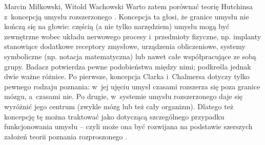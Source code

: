 \begin{artplenv2auth}{Marcin Miłkowski, Witold Wachowski}
Warto zatem porównać teorię Hutchinsa z~koncepcją umysłu rozszerzonego
\parencite[][]{clark_umysl_2008}. %
 Koncepcja ta głosi, że granice umysłu nie kończą się na głowie: częścią (a nie tylko narzędziem) umysłu mogą być zewnętrzne wobec układu nerwowego procesy i~przedmioty fizyczne, np. implanty stanowiące dodatkowe receptory zmysłowe, urządzenia obliczeniowe, systemy symboliczne (np. notacja matematyczna) lub nawet całe współpracujące ze sobą grupy. Badacz potwierdza pewne podobieństwa między nimi; podkreśla jednak dwie ważne różnice. Po pierwsze, koncepcja Clarka i~Chalmersa dotyczy tylko pewnego rodzaju poznania: w~jej ujęciu umysł czasami rozszerza się poza granice mózgu, a~czasami nie. Po drugie, w~systemie umysłu rozszerzonego daje się wyróżnić jego centrum (zwykle mózg lub też cały organizm). Dlatego też koncepcję tę można traktować jako dotyczącą szczególnego przypadku funkcjonowania umysłu -- czyli może ona być rozwijana na podstawie szerszych założeń teorii poznania rozproszonego 
\parencites[][s.~437–446]{hutchins_enculturating_2011}[][s.~35–36]{hutchins_cultural_2014}.%



\end{artplenv2auth}

